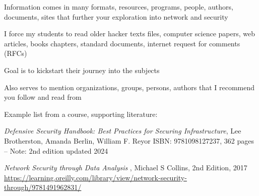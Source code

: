 \documentclass[Screen16to9,17pt]{foils}
\begin{document}
\begin{list2}
\item Information comes in many formats, resources, programs, people, authors, documents, sites
that further your exploration into network and security

\item I force my students to read older hacker texts files, computer science papers, web articles, books chapters, standard documents, internet request for comments (RFCs)

\item Goal is to kickstart their journey into the subjects

\item Also serves to mention organizations, groups, persons, authors that I recommend you follow and read from
\end{list2}

Example list from a course, supporting literature:\\




\emph{Defensive Security Handbook: Best Practices for Securing Infrastructure}, Lee Brotherston, Amanda Berlin, William F. Reyor ISBN: 9781098127237, 362 pages -- Note: 2nd edition updated 2024\\
{\footnotesize{}}




\emph{Network Security through Data Analysis }, Michael S Collins, 2nd Edition, 2017\\
{\footnotesize\url{https://learning.oreilly.com/library/view/network-security-through/9781491962831/}}



\end{document}
